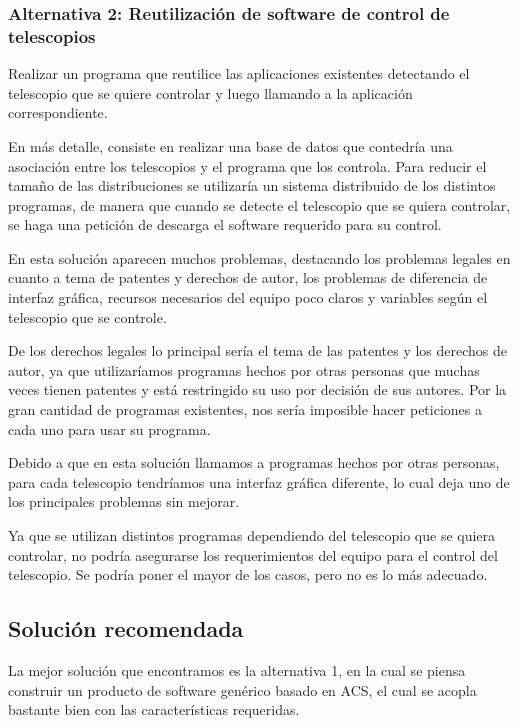 \documentclass[letterpaper,titlepage,spanish,10pt]{article}
\begin{document}
\subsubsection{Alternativa 2: Reutilizaci\'on de software de control de telescopios} %
Realizar un programa que reutilice las aplicaciones existentes detectando el telescopio
que se quiere controlar y luego llamando a la aplicaci\'on correspondiente.

En m\'as detalle, consiste en realizar una base de datos que contedr\'ia una 
asociaci\'on entre los telescopios y el programa que los controla. Para reducir
el tama\~no de las distribuciones se utilizar\'ia un sistema distribuido de los
distintos programas, de manera que cuando se detecte el telescopio que se quiera
controlar, se haga una petici\'on de descarga el software requerido para su control.

En esta soluci\'on aparecen muchos problemas, destacando los problemas legales en 
cuanto a tema de patentes y derechos de autor, los problemas de diferencia de 
interfaz gr\'afica, recursos necesarios del equipo poco claros y variables seg\'un 
el telescopio que se controle.

De los derechos legales lo principal ser\'ia el tema de las patentes y los derechos
de autor, ya que utilizar\'iamos programas hechos por otras personas que muchas 
veces tienen patentes y est\'a restringido su uso por decisi\'on de sus autores. 
Por la gran cantidad de programas existentes, nos ser\'ia imposible hacer peticiones 
a cada uno para usar su programa.

Debido a que en esta soluci\'on llamamos a programas hechos por otras personas, para
cada telescopio tendr\'iamos una interfaz gr\'afica diferente, lo cual deja uno de 
los principales problemas sin mejorar.

Ya que se utilizan distintos programas dependiendo del telescopio que se quiera 
controlar, no podr\'ia asegurarse los requerimientos del equipo para el control del
telescopio. Se podr\'ia poner el mayor de los casos, pero no es lo m\'as adecuado.

\subsection{Soluci\'on recomendada} %
La mejor soluci\'on que encontramos es la alternativa 1, en la cual se piensa construir
un producto de software gen\'erico basado en ACS, el cual se acopla bastante bien 
con las características requeridas.
\end{document}
